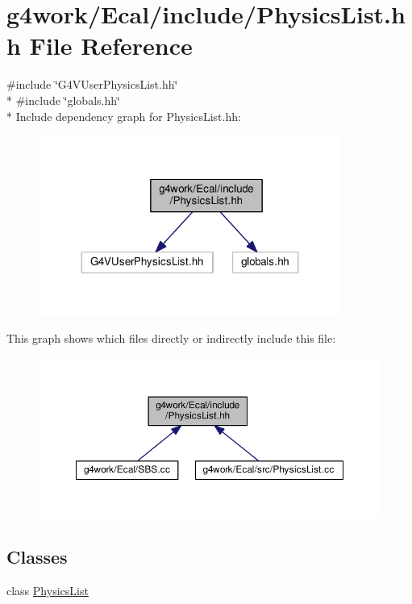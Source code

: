 \hypertarget{_physics_list_8hh}{\section{g4work/\-Ecal/include/\-Physics\-List.hh File Reference}
\label{_physics_list_8hh}
}
{\ttfamily \#include \char`\"{}G4\-V\-User\-Physics\-List.\-hh\char`\"{}}\\*
{\ttfamily \#include \char`\"{}globals.\-hh\char`\"{}}\\*
Include dependency graph for Physics\-List.\-hh\-:\nopagebreak
\begin{figure}[H]
\begin{center}
\leavevmode
\includegraphics[width=281pt]{_physics_list_8hh__incl}
\end{center}
\end{figure}
This graph shows which files directly or indirectly include this file\-:\nopagebreak
\begin{figure}[H]
\begin{center}
\leavevmode
\includegraphics[width=350pt]{_physics_list_8hh__dep__incl}
\end{center}
\end{figure}
\subsection*{Classes}
\begin{DoxyCompactItemize}
\item 
class \hyperlink{class_physics_list}{Physics\-List}
\end{DoxyCompactItemize}
